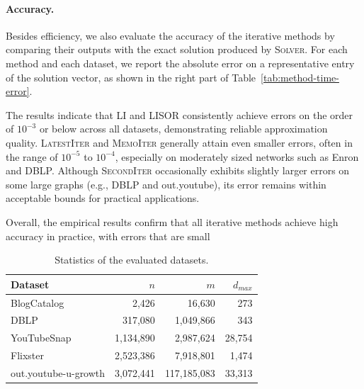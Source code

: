 \documentclass[sigconf,review, nonacm]{acmart}
\begin{document}
\paragraph{Accuracy.}
Besides efficiency, we also evaluate the accuracy of the iterative methods by comparing their outputs with the exact solution produced by \textsc{Solver}.
For each method and each dataset, we report the absolute error on a representative entry of the solution vector, as shown in the right part of Table~\ref{tab:method-time-error}.

The results indicate that \textsc{LI} and \textsc{LISOR} consistently achieve errors on the order of $10^{-3}$ or below across all datasets, demonstrating reliable approximation quality.
\textsc{LatestIter} and \textsc{MemoIter} generally attain even smaller errors, often in the range of $10^{-5}$ to $10^{-4}$, especially on moderately sized networks such as Enron and DBLP.
Although \textsc{SecondIter} occasionally exhibits slightly larger errors on some large graphs (e.g., DBLP and out.youtube), its error remains within acceptable bounds for practical applications.

Overall, the empirical results confirm that all iterative methods achieve high accuracy in practice, with errors that are small



\begin{table}[t]
\caption{Statistics of the evaluated datasets.}
\label{tab:datasets}
\centering
\begin{tabular}{lrrr}
\toprule
\textbf{Dataset} & \textbf{$n$} & \textbf{$m$} & \textbf{$d_{max}$} \\
\midrule
BlogCatalog          & 2,426     & 16,630       & 273    \\
DBLP                 & 317,080   & 1,049,866    & 343    \\
YouTubeSnap          & 1,134,890 & 2,987,624    & 28,754 \\
Flixster             & 2,523,386 & 7,918,801    & 1,474  \\
out.youtube-u-growth & 3,072,441 & 117,185,083  & 33,313 \\
\bottomrule
\end{tabular}
\end{table}
\end{document}
